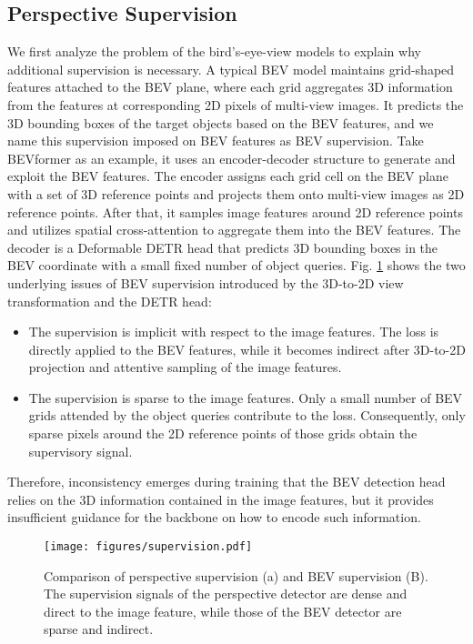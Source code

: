 \documentclass[10pt,twocolumn,letterpaper]{article}
\begin{document}
\subsection{Perspective Supervision}
We first analyze the problem of the bird's-eye-view models to explain why additional supervision is necessary. 
A typical BEV model maintains grid-shaped features attached to the BEV plane, where each grid aggregates 3D information from the features at corresponding 2D pixels of multi-view images. 
It predicts the 3D bounding boxes of the target objects based on the BEV features, and we name this supervision imposed on BEV features as BEV supervision. 
Take BEVformer \cite{bevformer} as an example, it uses an encoder-decoder structure to generate and exploit the BEV features. 
The encoder assigns each grid cell on the BEV plane with a set of 3D reference points and projects them onto multi-view images as 2D reference points. 
After that, it samples image features around 2D reference points and utilizes spatial cross-attention to aggregate them into the BEV features. 
The decoder is a Deformable DETR \cite{deformable-detr} head that predicts 3D bounding boxes in the BEV coordinate with a small fixed number of object queries. 
Fig. \ref{fig:supervision} shows the two underlying issues of BEV supervision introduced by the 3D-to-2D view transformation and the DETR \cite{DETR} head: 
\begin{itemize}
    \item The supervision is implicit with respect to the image features.
    The loss is directly applied to the BEV features, while it becomes indirect after 3D-to-2D projection and attentive sampling of the image features.
    \item The supervision is sparse to the image features. 
    Only a small number of BEV grids attended by the object queries contribute to the loss. Consequently, only sparse pixels around the 2D reference points of those grids obtain the supervisory signal.
\end{itemize}
Therefore, inconsistency emerges during training that the BEV detection head relies on the 3D information contained in the image features, but it provides insufficient guidance for the backbone on how to encode such information.

\label{sec:perspective_supervision}
\begin{figure}[t]
    \centering
    \texttt{[image: figures/supervision.pdf]}
    \caption{Comparison of perspective supervision (a) and BEV supervision (B). The supervision signals of the perspective detector are dense and direct to the image feature, while those of the BEV detector are sparse and indirect.}
    \label{fig:supervision}
\end{figure}
\end{document}

